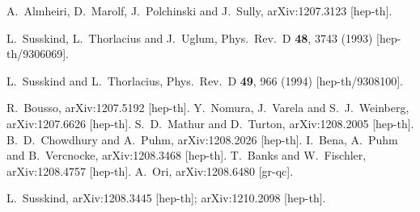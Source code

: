 \documentclass[12pt]{article}
\begin{document}
\begin{thebibliography}{99}
  A.~Almheiri, D.~Marolf, J.~Polchinski and J.~Sully,
  arXiv:1207.3123 [hep-th].

  L.~Susskind, L.~Thorlacius and J.~Uglum,
  Phys.\ Rev.\ D {\bf 48}, 3743 (1993)
  [hep-th/9306069].

  L.~Susskind and L.~Thorlacius,
  Phys.\ Rev.\ D {\bf 49}, 966 (1994)
  [hep-th/9308100].

  R.~Bousso,
  arXiv:1207.5192 [hep-th].
  Y.~Nomura, J.~Varela and S.~J.~Weinberg,
  arXiv:1207.6626 [hep-th].
  S.~D.~Mathur and D.~Turton,
  arXiv:1208.2005 [hep-th].
  B.~D.~Chowdhury and A.~Puhm,
  arXiv:1208.2026 [hep-th].
  I.~Bena, A.~Puhm and B.~Vercnocke,
  arXiv:1208.3468 [hep-th].
  T.~Banks and W.~Fischler,
  arXiv:1208.4757 [hep-th].
  A.~Ori,
  arXiv:1208.6480 [gr-qc].


  L.~Susskind,
  arXiv:1208.3445 [hep-th];
  arXiv:1210.2098 [hep-th].



\end{thebibliography}
\end{document}
